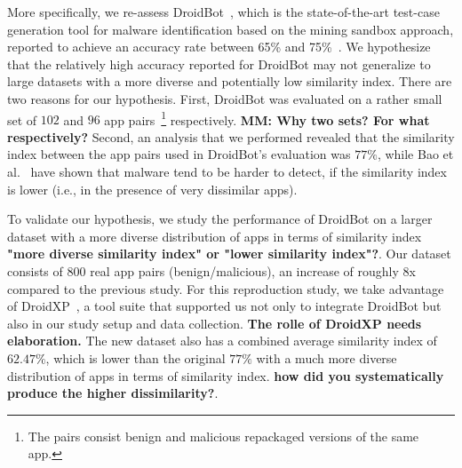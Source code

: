 More specifically, we re-assess DroidBot~\cite{DBLP:conf/wcre/BaoLL18,DBLP:journals/jss/CostaMMSSBNR22}, which is the state-of-the-art test-case generation tool for malware identification based on the mining sandbox approach,
reported to achieve an accuracy rate between 65\% and 75\%~\cite{DBLP:conf/wcre/BaoLL18,DBLP:journals/jss/CostaMMSSBNR22}. 
 We hypothesize that the relatively high accuracy reported for DroidBot 
may not generalize to large datasets with a more diverse and potentially low similarity index.
There are two reasons for our hypothesis. First, DroidBot was evaluated on a rather small set of $102$ and $96$ app pairs~\footnote{The pairs consist benign and malicious repackaged versions of the same app.} respectively. \textbf{MM: Why two sets? For what respectively?} Second, an analysis that we performed revealed that the similarity index between the app pairs used in DroidBot's evaluation was $77\%$, while Bao et al.~\cite{DBLP:conf/iceccs/LeB0GL18} %
have shown that malware tend to be harder to detect, if the similarity index is lower 
(i.e., in the presence of very dissimilar apps). 

To validate our hypothesis, we study the performance of DroidBot on a larger dataset with a more diverse distribution of apps in terms of similarity index \textbf{"more diverse similarity index" or "lower similarity index"?}. Our dataset consists of $800$ real app pairs (benign/malicious), an increase of roughly 8x compared to the previous study. For this reproduction study, we take advantage of DroidXP~\cite{DBLP:conf/scam/CostaMCMVBC20}, a tool suite that supported us not only to integrate DroidBot but also in our study setup and data collection. \textbf{The rolle of DroidXP needs elaboration.} The new dataset also has a combined average similarity index of $62.47\%$, which is lower than the original $77\%$ with a much more diverse distribution of apps in terms of similarity index. \textbf{how did you systematically produce the higher dissimilarity?}. 

